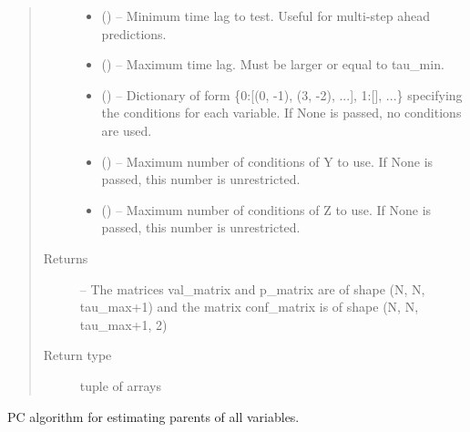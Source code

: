 \documentclass[letterpaper,10pt,english]{sphinxmanual}
\begin{document}
\begin{fulllineitems}
\begin{fulllineitems}
\begin{quote}
\begin{description}
\begin{itemize}
\item {} 
 (\sphinxstyleliteralemphasis{, }) -- Minimum time lag to test. Useful for multi-step ahead predictions.

\item {} 
 (\sphinxstyleliteralemphasis{, }) -- Maximum time lag. Must be larger or equal to tau\_min.

\item {} 
 () -- Dictionary of form \{0:{[}(0, -1), (3, -2), ...{]}, 1:{[}{]}, ...\}
specifying the conditions for each variable. If None is
passed, no conditions are used.

\item {} 
 () -- Maximum number of conditions of Y to use. If None is passed, this
number is unrestricted.

\item {} 
 () -- Maximum number of conditions of Z to use. If None is passed, this
number is unrestricted.

\end{itemize}

\item[{Returns}] \leavevmode
{} -- The matrices val\_matrix and p\_matrix are of shape (N, N, tau\_max+1)
and the matrix conf\_matrix is of shape (N, N, tau\_max+1, 2)

\item[{Return type}] \leavevmode
tuple of arrays

\end{description}\end{quote}

\end{fulllineitems}


\begin{fulllineitems}
\label{\detokenize{index:tigramite.pcmci.PCMCI.run_pc_stable}}
PC algorithm for estimating parents of all variables.


\end{fulllineitems}
\end{fulllineitems}
\end{document}
